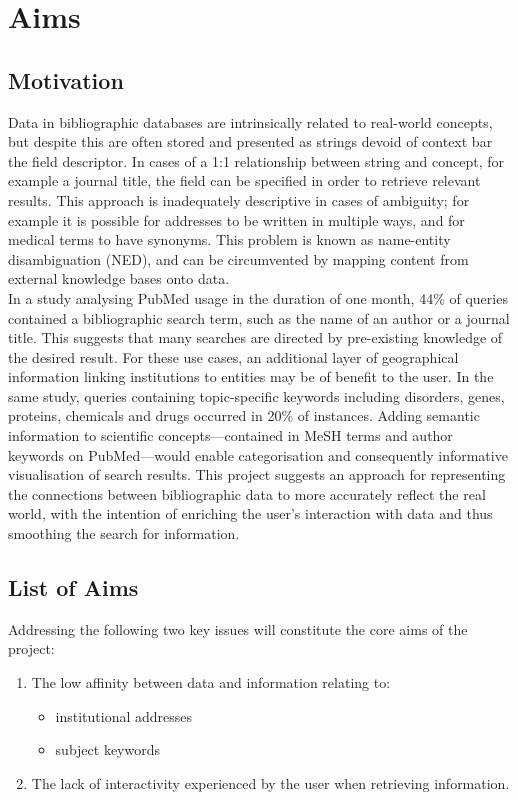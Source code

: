\documentclass[PROP_AGutteridge_CS.tex]{subfiles}
\begin{document}
\chapter{Aims}
\section{Motivation}
Data in bibliographic databases are intrinsically related to real-world concepts, but despite this are often stored and presented as strings devoid of context bar the field descriptor. In cases of a 1:1 relationship between string and concept, for example a journal title, the field can be specified in order to retrieve relevant results. This approach is inadequately descriptive in cases of ambiguity; for example it is possible for addresses to be written in multiple ways, and for medical terms to have synonyms. This problem is known as name-entity disambiguation (NED), and can be circumvented by mapping content from external knowledge bases onto data\cite{hoffart}. \\

\noindent In a study analysing PubMed usage in the duration of one month, 44\% of queries contained a bibliographic search term, such as the name of an author or a journal title\cite{dogan}. This suggests that many searches are directed by pre-existing knowledge of the desired result. For these use cases, an additional layer of geographical information linking institutions to entities may be of benefit to the user. In the same study, queries containing topic-specific keywords including disorders, genes, proteins, chemicals and drugs occurred in 20\% of instances. Adding semantic information to scientific concepts---contained in MeSH terms and author keywords on PubMed---would enable categorisation and consequently informative visualisation of search results. This project suggests an approach for representing the connections between bibliographic data to more accurately reflect the real world, with the intention of enriching the user's interaction with data and thus smoothing the search for information. 

\section{List of Aims}
Addressing the following two key issues will constitute the core aims of the project:
\begin{enumerate}
\item The low affinity between data and information relating to:
	\begin{itemize}
	\item institutional addresses
	\item subject keywords
	\end{itemize}
\item The lack of interactivity experienced by the user when retrieving information.
\end{enumerate}
\end{document}
